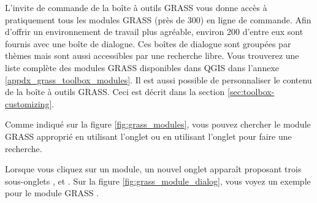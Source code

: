 L'invite de commande de la bo\^ite \`a outils GRASS vous donne acc\`es \`a pratiquement tous les modules GRASS (pr\`es de 300) en ligne de commande. Afin d'offrir un environnement de travail plus agr\'eable, environ 200 d'entre eux sont fournis avec une bo\^ite de dialogue. Ces bo\^ites de dialogue sont group\'ees par th\`emes mais sont aussi accessibles par une recherche libre. Vous trouverez une liste compl\`ete des modules GRASS disponibles dans QGIS \CURRENT dans l'annexe \ref{appdx_grass_toolbox_modules}. Il est aussi possible de personnaliser le contenu de la bo\^ite \`a outils GRASS. Ceci est d\'ecrit dans la section \ref{sec:toolbox-customizing}.

Comme indiqu\'e sur la figure \ref{fig:grass_modules}, vous pouvez chercher le module GRASS appropri\'e en utilisant l'onglet  ou en utilisant l'onglet  pour faire une recherche.

Lorsque vous cliquez sur un module, un nouvel onglet appara\^it proposant trois sous-onglets ,  et . Sur la figure \ref{fig:grass_module_dialog}, vous voyez un exemple pour le module GRASS .

